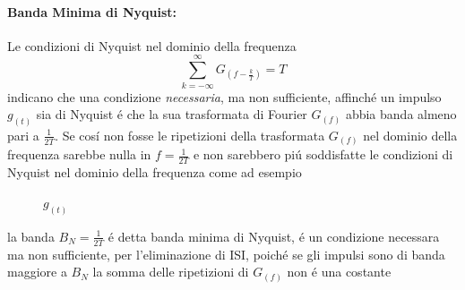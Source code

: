            \paragraph*{Banda Minima di Nyquist:} Le condizioni di Nyquist nel dominio della frequenza
            \[
                \sum_{k= -\infty}^{\infty} G_{(f-\frac{k}{T})} = T
            \]
            indicano che una condizione \emph{necessaria}, ma non sufficiente, affinché un impulso $g_{(t)}$ sia di Nyquist
            é che la sua trasformata di Fourier $G_{(f)}$ abbia banda almeno pari a $\frac{1}{2T}$. Se cosí non fosse
            le ripetizioni della trasformata $G_{(f)}$ nel dominio della frequenza sarebbe nulla in $f=\frac{1}{2T}$ e non sarebbero
            piú soddisfatte le condizioni di Nyquist nel dominio della frequenza come ad esempio
            \begin{figure}[H]
                \centering
                    \caption{$g_{(t)}$}          
            \end{figure}
            la banda $B_N =\frac{1}{2T}$ é detta banda minima di Nyquist, é un condizione necessara ma non sufficiente, per l'eliminazione di ISI,
            poiché se gli impulsi sono di banda maggiore a $B_N$ la somma delle ripetizioni di $G_{(f)}$ non é una costante
